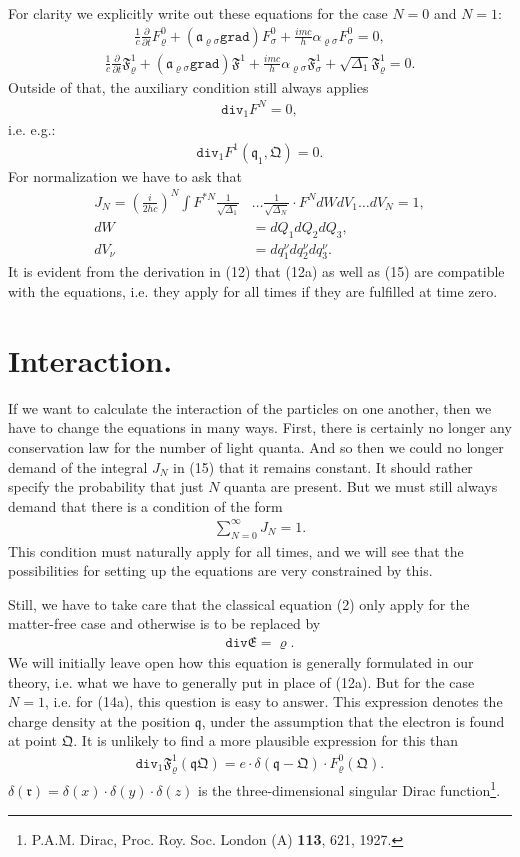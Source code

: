 \documentclass[a4paper,11pt]{article}
\newcommand{\?}[2]{#1\footnote{\textsc{Translator note}: #2}}
\newcommand{\nequ}[2]{\begin{align*}\tag{#1}#2\end{align*}}
\renewcommand{\operatorfont}[1]{\texttt{#1}}
\newcommand{\grad}{\operatorfont{grad}}
\renewcommand{\div}{\operatorfont{div}}
\newcommand{\pXpY}[2]{\frac{\partial #1}{\partial #2}}
\newcommand{\mf}[1]{\mathfrak{#1}}
\begin{document}
For clarity we explicitly write out these equations for the case $N=0$ and $N=1$:
\nequ{13}{
\frac{1}{c}\pXpY{}{t}F_\varrho^0 + \left(\mf{a}_{\varrho\sigma}\grad\right)F_\sigma^0 + \frac{imc}{h}\alpha_{\varrho\sigma}F_\sigma^0 = 0,
}
\nequ{14}{
\frac{1}{c}\pXpY{}{t}\mf{F}_\varrho^1 + \left(\mf{a}_{\varrho\sigma}\grad\right)\mf{F}^1 + \frac{imc}{h}\alpha_{\varrho\sigma}\mf{F}_\sigma^1 + \sqrt{\Delta_1}\mf{F}_\varrho^1 = 0.
}
Outside of that, the auxiliary condition still always applies
\nequ{12a}{
\div_1 F^N = 0,
}
i.e. e.g.:
\nequ{14a}{
\div_1 F^1(\mf{q}_1, \mf{Q}) = 0.
}
For normalization we have to ask that
\nequ{15}{
J_N = \left(\frac{i}{2hc}\right)^N
\int F^{*N}\frac{1}{\sqrt{\Delta_1}}&\dots\frac{1}{\sqrt{\Delta_N}}
\cdot F^N dW dV_1 \dots dV_N = 1,\\
dW &= dQ_1 dQ_2 dQ_3,\\
dV_\nu &= dq_1^\nu dq_2^\nu dq_3^\nu.
}
It is evident from the derivation in (12) that (12a) as well as (15) are compatible with the equations, i.e. they apply for all times if they are fulfilled at time zero.

\section{Interaction.} If we want to calculate the interaction of the particles on one another, then we have to change the equations in many ways. First, there is certainly no longer any conservation law for the number of light quanta. And so then we could no longer demand of the integral $J_N$ in (15) that it remains constant. It should rather specify the probability that just $N$ quanta are present. But we must still always demand that there is a condition of the form
\nequ{16}{
\sum\limits_{N=0}^\infty J_N = 1.
}
This condition must naturally apply for all times, and we will see that the possibilities for setting up the equations are very constrained by this.

Still, we have to take care that the classical equation (2) only apply for the matter-free case and otherwise is to be replaced by 
\nequ{17}{
\div\mf{E} = \varrho.
}
We will initially leave open how this equation is generally formulated in our theory, i.e. what we have to generally put in place of (12a). But for the case $N=1$, i.e. for (14a), this question is easy to answer. This expression denotes the charge density at the position $\mf{q}$, under the assumption that the electron is found at point $\mf{Q}$. It is unlikely to find a more plausible expression for this than
\nequ{18}{
\div_1\mf{F}_\varrho^1(\mf{q}\mf{Q}) = e\cdot \delta (\mf{q} - \mf{Q})\cdot F_\varrho^0(\mf{Q}).
}
$\delta(\mf{r}) = \delta(x)\cdot\delta(y)\cdot\delta(z)$ is the three-dimensional singular Dirac function\footnote{P.A.M. Dirac, Proc. Roy. Soc. London (A) \textbf{113}, 621, 1927.}.
\end{document}
